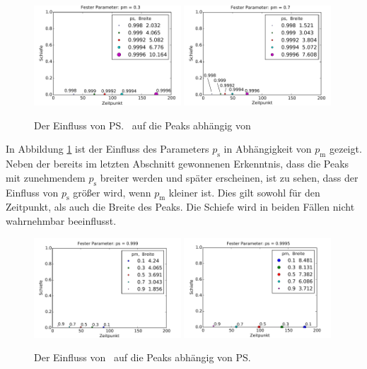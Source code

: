 \begin{figure}[h]
\includegraphics[width=0.49\textwidth]{bilder/ps/psfest_pm03}
\includegraphics[width=0.49\textwidth]{bilder/ps/psfest_pm07}
\caption{Der Einfluss von \ps\ auf die Peaks abhängig von \pm}
\label{einfluss_ps_1}
\end{figure}

In Abbildung \ref{einfluss_ps_1} ist der Einfluss des Parameters $p_{\text{s}}$ in Abhängigkeit von $p_{\text{m}}$ gezeigt. Neben der bereits im letzten Abschnitt gewonnenen Erkenntnis, dass die Peaks mit zunehmendem $p_{\text{s}}$ breiter werden und später erscheinen, ist zu sehen, dass der Einfluss von $p_{\text{s}}$ größer wird, wenn $p_{\text{m}}$ kleiner ist. Dies gilt sowohl für den Zeitpunkt, als auch die Breite des Peaks. Die Schiefe wird in beiden Fällen nicht wahrnehmbar beeinflusst.

\begin{figure}[h]
\includegraphics[width=0.49\textwidth]{bilder/pm/pmfest_ps0999}
\includegraphics[width=0.49\textwidth]{bilder/pm/pmfest_ps09995}
\caption{Der Einfluss von \pm\ auf die Peaks abhängig von \ps}
\label{einfluss_pm_1}
\end{figure}

